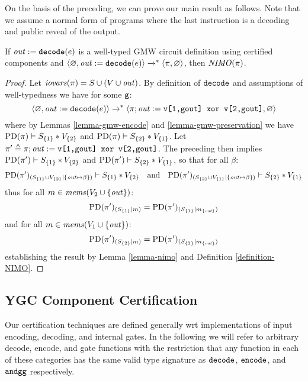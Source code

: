 On the basis of the preceding, we can prove our main result as
follows. Note that we assume a normal form of programs where the last
instruction is a decoding and public reveal of the output.
\begin{theorem}
  \label{theorem-gmw-NIMO}
  If $\mathit{out} := \texttt{decode}(e)$ is a well-typed GMW circuit
  definition using certified components and
  $\langle \varnothing,\mathit{out} := \texttt{decode}(e) \rangle \xrightarrow{}^{*}
  \langle \pi,\varnothing \rangle$, then $\mathit{NIMO}(\pi)$.
\end{theorem}
\begin{proof}
  Let $\mathit{iovars}(\pi) = S \cup (V \cup \mathit{out})$. By definition of $\texttt{decode}$
  and assumptions of well-typedness we have for some $\texttt{g}$:
  $$
  \langle \varnothing,\mathit{out} := \texttt{decode}(e) \rangle \xrightarrow{}^{*}
  \langle \pi;\mathit{out} := \texttt{v[1,gout] xor v[2,gout]},\varnothing \rangle
  $$
  where by Lemmas \ref{lemma-gmw-encode} and \ref{lemma-gmw-preservation} we
  have $\mathrm{PD}(\pi) \vdash S_{\{1\}} * V_{\{2\}}$ and
  $\mathrm{PD}(\pi) \vdash S_{\{2\}} * V_{\{1\}}$.
  Let $\pi' \triangleq \pi;\mathit{out} := \texttt{v[1,gout] xor v[2,gout]}$. The
  preceding then implies
  $\mathrm{PD}(\pi') \vdash S_{\{1\}} * V_{\{2\}}$ and
  $\mathrm{PD}(\pi') \vdash S_{\{2\}} * V_{\{1\}}$,
  so that for all $\beta$:
  $$\mathrm{PD}(\pi')_{({S_{\{1\}} \cup V_{\{2\}}}|{\{ \mathit{out} \mapsto \beta \}})} \vdash S_{\{1\}} * V_{\{2\}}
  \quad \text{and} \quad
    \mathrm{PD}(\pi')_{({S_{\{2\}} \cup V_{\{1\}}}|{\{ \mathit{out} \mapsto \beta \}})} \vdash S_{\{2\}} * V_{\{1\}}$$
  thus for all $m \in \mathit{mems}(V_2 \cup \{ \mathit{out} \})$:
  $$\mathrm{PD}(\pi')_{({S_{\{1\}}}|{m})}
  = \mathrm{PD}(\pi')_{({S_{\{1\}}}|{m_{\{\mathit{out}\}}})}$$
  and for all $m \in \mathit{mems}(V_1 \cup \{ \mathit{out} \})$:
  $$\mathrm{PD}(\pi')_{({S_{\{2\}}}|{m})}
  = \mathrm{PD}(\pi')_{({S_{\{2\}}}|{m_{\{\mathit{out}\}}})}$$
  establishing the result by Lemma \ref{lemma-nimo} and Definition \ref{definition-NIMO}. 
\end{proof}

\subsection{YGC Component Certification}
\label{section-ygc-certification}

Our certification techniques are defined generally wrt implementations
of input encoding, decoding, and internal gates. In the following we
will refer to arbitrary decode, encode, and gate functions with the
restriction that any function in each of these categories has the same
valid type signature as $\texttt{decode}$, $\texttt{encode}$, and
$\texttt{andgg}$ respectively.


